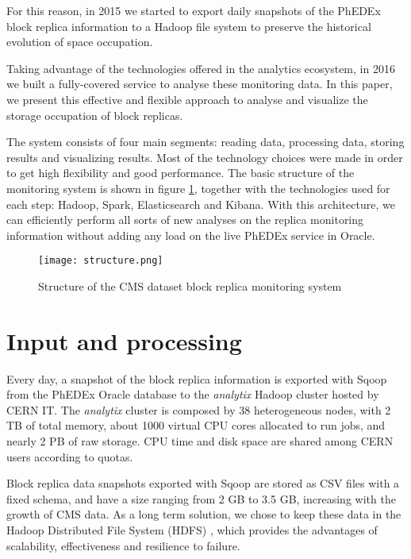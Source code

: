 \documentclass[a4paper]{jpconf}
\begin{document}
For this reason, in 2015 we started to export daily snapshots of the PhEDEx block replica information to a Hadoop file system to preserve the historical evolution of space occupation.

Taking advantage of the technologies offered in the analytics ecosystem, in 2016 we built a fully-covered service to analyse these monitoring data. In this paper, we present this effective and flexible approach to analyse and visualize the storage occupation of block replicas.

The system consists of four main segments: reading data, processing data, storing results and visualizing results. Most of the technology choices were made in order to get high flexibility and good performance. 
The basic structure of the monitoring system is shown in figure \ref{fig:structure}, together with the technologies used for each step: Hadoop, Spark, Elasticsearch and Kibana.
With this architecture, we can efficiently perform all sorts of new analyses on the replica monitoring information without adding any load on the live PhEDEx service in Oracle.

\begin{figure}[t]
\begin{center}
\texttt{[image: structure.png]}\hspace{2pc}%
\caption{\label{fig:structure}Structure of the CMS dataset block replica monitoring system}
\end{center}
\end{figure}


\section{Input and processing}

Every day, a snapshot of the block replica information is exported with Sqoop \cite{Sqoop} from the PhEDEx Oracle database to the \textit{analytix} Hadoop cluster hosted by CERN IT. The \textit{analytix} cluster is composed by 38 heterogeneous nodes, with 2 TB of total memory, about 1000 virtual CPU cores allocated to run jobs, and nearly 2 PB of raw storage. CPU time and disk space are shared among CERN users according to quotas.

Block replica data snapshots exported with Sqoop are stored as CSV files with a fixed schema, and have a size ranging from 2 GB to 3.5 GB, increasing with the growth of CMS data. As a long term solution, we chose to keep these data in the Hadoop Distributed File System (HDFS) \cite{Hadoop}, which provides the advantages of scalability, effectiveness and resilience to failure.
 
\end{document}
